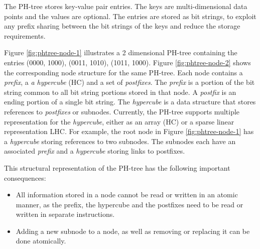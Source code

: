 \documentclass[11pt,a4paper]{globis-book}
\begin{document}
The PH-tree stores key-value pair entries. The keys are multi-dimensional data points and the values are optional. The entries are stored as bit strings, to exploit any prefix sharing between the bit strings of the keys and reduce the storage requirements. 

Figure \ref{fig:phtree-node-1} illustrates a 2 dimensional PH-tree containing  the entries (0000, 1000), (0011, 1010), (1011, 1000). Figure \ref{fig:phtree-node-2} shows the corresponding node structure for the same PH-tree. Each node contains a \textit{prefix}, a \textit{a hypercube} (HC) and a set of \textit{postfixes}. The \textit{prefix} is a portion of the bit string common to all bit string portions stored in that node. A \textit{postfix} is an ending portion of a single bit string. The \textit{hypercube} is a data structure that stores references to \textit{postfixes} or subnodes. Currently, the PH-tree supports multiple representation for the \textit{hypercube}, either as an array (HC) or a sparse linear representation {LHC}. For example, the root node in Figure \ref{fig:phtree-node-1} has a \textit{hypercube} storing references to two subnodes. The subnodes each have an associated \textit{prefix} and a \textit{hypercube} storing links to postfixes. 

This structural representation of the PH-tree has the following important consequences:
\begin{itemize}
    \item All information stored in a node cannot be read or written in an atomic manner, as the prefix, the hypercube and the postfixes need to be read or written in separate instructions. 
    \item Adding a new subnode to a node, as well as removing or replacing it can be done atomically.      
\end{itemize} 
\end{document}
